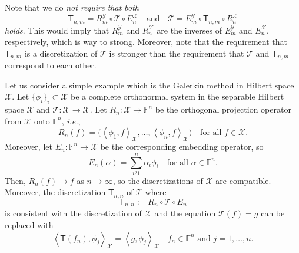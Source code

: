 \documentclass[a4paper]{paper}
\newcommand{\VecSpace}[1]{\mathscr{#1}}
\newcommand{\Field}{\mathbb{F}}
\newcommand{\Op}[1]{\mathcal{#1}}
\newcommand{\DiscOp}[1]{\mathsf{#1}}
\newcommand{\ip}[2]{\left \langle #1,#2 \right\rangle}
\newcommand{\ie}{\textsl{i.e.}\xspace}
\begin{document}
\begin{remark}
Note that we do \emph{not require that both  
\[ \DiscOp{T}_{n,m} = R_{m}^{\VecSpace{Y}} \circ \Op{T} \circ E_{n}^{\VecSpace{X}} \quad\text{and}\quad
    \Op{T} = E_{m}^{\VecSpace{Y}} \circ \DiscOp{T}_{n,m} \circ R_{n}^{\VecSpace{X}} \]
holds}. This would imply that  $R_{m}^{\VecSpace{Y}}$ and $R_{n}^{\VecSpace{X}}$ are the inverses of $E_{m}^{\VecSpace{Y}}$ and 
$E_{n}^{\VecSpace{X}}$, respectively, which is way to strong. Moreover, note that the requirement that 
$\DiscOp{T}_{n,m}$ is a discretization of $\Op{T}$ is stronger than  the requirement that 
$\Op{T}$ and $\DiscOp{T}_{n,m}$ correspond to each other.
\end{remark}

\begin{examp}
Let us consider a simple example which is the 
Galerkin method in Hilbert space $\VecSpace{X}$. Let $\{ \phi_{i} \}_{i}\subset \VecSpace{X}$ be a 
complete orthonormal system in the separable Hilbert space $\VecSpace{X}$ and 
$\Op{T} \colon \VecSpace{X} \to \VecSpace{X}$. 
Let $R_{n} \colon \VecSpace{X} \to \Field^{n}$ be the orthogonal projection operator 
from $\VecSpace{X}$ onto $\Field^{n}$, \ie,
\[ R_{n}(f)= \bigl( \ip{\phi_{1}}{f}_{\VecSpace{X}}, \ldots, \ip{\phi_{n}}{f}_{\VecSpace{X}} \bigr)
   \quad\text{for all $f\in \VecSpace{X}$.} \]
Moreover, let $E_{n}\colon \Field^{n} \to \VecSpace{X}$ be the corresponding embedding operator, so
\[ E_{n}(\alpha)= \sum_{i?1}^n \alpha_i \phi_{i}
   \quad\text{for all $\alpha\in \Field^{n}$.} \]
Then, $R_{n}(f)\to f$ as $n\to \infty$, so the discretizations of $\VecSpace{X}$ are 
compatible. Moreover, the discretization $\DiscOp{T}_{n,n}$ of $\Op{T}$ where 
\[ \DiscOp{T}_{n,n}:=R_{n}\circ \Op{T} \circ E_{n} \]
is consistent with the discretization of $\VecSpace{X}$ and the equation
$\Op{T}(f)=g$ can be replaced with 
\[ \ip{\DiscOp{T}(f_{n})}{\phi_{j}}_{\VecSpace{X}}=\ip{g}{\phi_{j}}_{\VecSpace{X}}
   \quad\text{$f_{n}\in \Field^{n}$ and $j=1,\ldots,n$.} \]
\end{examp}
\end{document}
